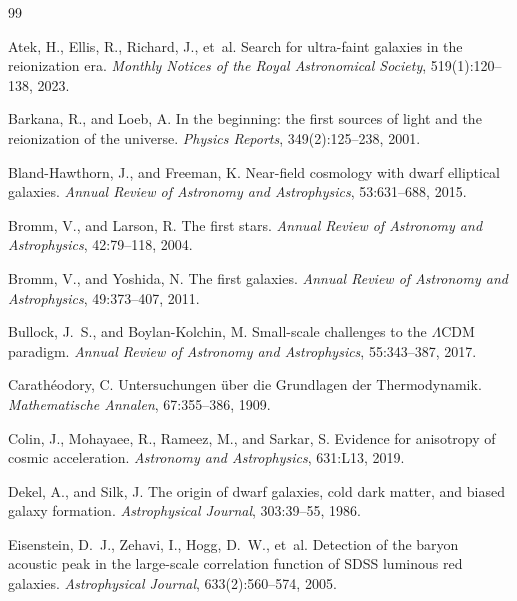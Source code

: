 \documentclass[12pt, a4paper]{article}
\theoremstyle{definition}
\begin{document}
\newpage
\begin{thebibliography}{99}

Atek, H., Ellis, R., Richard, J., et~al.
\newblock Search for ultra-faint galaxies in the reionization era.
\newblock \textit{Monthly Notices of the Royal Astronomical Society}, 519(1):120--138, 2023.

Barkana, R., and Loeb, A.
\newblock In the beginning: the first sources of light and the reionization of the universe.
\newblock \textit{Physics Reports}, 349(2):125--238, 2001.

Bland-Hawthorn, J., and Freeman, K.
\newblock Near-field cosmology with dwarf elliptical galaxies.
\newblock \textit{Annual Review of Astronomy and Astrophysics}, 53:631--688, 2015.

Bromm, V., and Larson, R.
\newblock The first stars.
\newblock \textit{Annual Review of Astronomy and Astrophysics}, 42:79--118, 2004.

Bromm, V., and Yoshida, N.
\newblock The first galaxies.
\newblock \textit{Annual Review of Astronomy and Astrophysics}, 49:373--407, 2011.

Bullock, J.~S., and Boylan-Kolchin, M.
\newblock Small-scale challenges to the $\Lambda$CDM paradigm.
\newblock \textit{Annual Review of Astronomy and Astrophysics}, 55:343--387, 2017.

Carath\'{e}odory, C.
\newblock Untersuchungen \"{u}ber die Grundlagen der Thermodynamik.
\newblock \textit{Mathematische Annalen}, 67:355--386, 1909.

Colin, J., Mohayaee, R., Rameez, M., and Sarkar, S.
\newblock Evidence for anisotropy of cosmic acceleration.
\newblock \textit{Astronomy and Astrophysics}, 631:L13, 2019.

Dekel, A., and Silk, J.
\newblock The origin of dwarf galaxies, cold dark matter, and biased galaxy formation.
\newblock \textit{Astrophysical Journal}, 303:39--55, 1986.

Eisenstein, D.~J., Zehavi, I., Hogg, D.~W., et~al.
\newblock Detection of the baryon acoustic peak in the large-scale correlation function
  of SDSS luminous red galaxies.
\newblock \textit{Astrophysical Journal}, 633(2):560--574, 2005.


\end{thebibliography}
\end{document}

